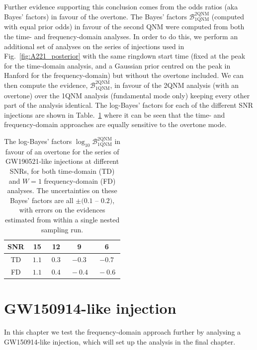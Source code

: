 Further evidence supporting this conclusion comes from the odds ratios (aka Bayes' factors) in favour of the overtone.
The Bayes' factors $\mathcal{B}^{2\mathrm{QNM}}_{1\mathrm{QNM}}$ (computed with equal prior odds) in favour of the second QNM were computed from both the time- and frequency-domain analyses. 
In order to do this, we perform an additional set of analyses on the series of injections used in Fig.~\ref{fig:A221_posterior} with the same ringdown start time (fixed at the peak for the time-domain analysis, and a Gaussian prior centred on the peak in Hanford for the frequency-domain) but without the overtone included.
We can then compute the evidence, $\mathcal{B}_{1\mathrm{QNM}}^{2\mathrm{QNM}}$, in favour of the 2QNM analysis (with an overtone) over the 1QNM analysis (fundamental mode only) keeping every other part of the analysis identical. 
The log-Bayes' factors for each of the different SNR injections are shown in Table.~\ref{tab:bayes_factors} where it can be seen that the time- and frequency-domain approaches are equally sensitive to the overtone mode.

\begin{table}[h!]
    \centering
    \begin{tabular}{c|cccc}
    SNR & 15   & 12   & 9   & 6  \\ \hline
    TD & $~ 1.1 ~$ & $0.3$ & $-0.3$ & $-0.7$ \\
    FD & $~ 1.1 ~$ & $~ 0.4 ~$ & $~ -0.4 ~ $ & $~ -0.6 ~$   
    \end{tabular}
    \caption[The log-Bayes' factors in favour of an overtone for the series of GW190521-like injections at different SNRs, for both time-domain and $W=1$ frequency-domain analyses]{ 
    The log-Bayes' factors $\log_{10}\mathcal{B}^{2\mathrm{QNM}}_{1\mathrm{QNM}}$ in favour of an overtone for the series of GW190521-like injections at different SNRs, for both time-domain (TD) and $W=1$ frequency-domain (FD) analyses. 
    The uncertainties on these Bayes' factors are all $\pm (0.1$ -- $0.2)$, with errors on the evidences estimated from within a single nested sampling run.
    }
    \label{tab:bayes_factors}
\end{table}


\section{GW150914-like injection}\label{app:GW150914}

In this chapter we test the frequency-domain approach further by analysing a GW150914-like injection, which will set up the analysis in the final chapter.

